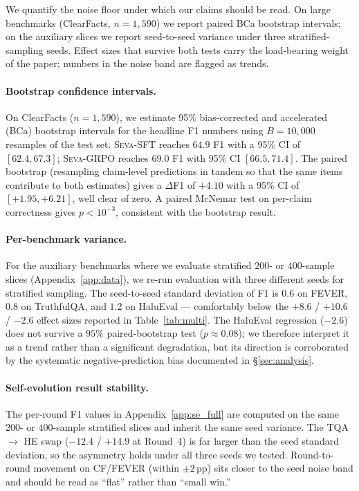 \documentclass{article}
\newcommand{\seva}{\textsc{Seva}\xspace}
\begin{document}
We quantify the noise floor under which our claims should be read.
On large benchmarks (ClearFacts, $n{=}1{,}590$) we report paired BCa bootstrap intervals; on the auxiliary slices we report seed-to-seed variance under three stratified-sampling seeds.
Effect sizes that survive both tests carry the load-bearing weight of the paper; numbers in the noise band are flagged as trends.

\paragraph{Bootstrap confidence intervals.}
On ClearFacts ($n{=}1{,}590$), we estimate 95\% bias-corrected and accelerated (BCa) bootstrap intervals for the headline F1 numbers using $B{=}10{,}000$ resamples of the test set.
\seva-SFT reaches $64.9$ F1 with a 95\% CI of $[62.4, 67.3]$; \seva-GRPO reaches $69.0$ F1 with 95\% CI $[66.5, 71.4]$.
The paired bootstrap (resampling claim-level predictions in tandem so that the same items contribute to both estimates) gives a $\Delta$F1 of $+4.10$ with a 95\% CI of $[+1.95, +6.21]$, well clear of zero.
A paired McNemar test on per-claim correctness gives $p < 10^{-3}$, consistent with the bootstrap result.

\paragraph{Per-benchmark variance.}
For the auxiliary benchmarks where we evaluate stratified $200$- or $400$-sample slices (Appendix~\ref{app:data}), we re-run evaluation with three different seeds for stratified sampling.
The seed-to-seed standard deviation of F1 is $0.6$ on FEVER, $0.8$ on TruthfulQA, and $1.2$ on HaluEval --- comfortably below the $+8.6$ / $+10.6$ / $-2.6$ effect sizes reported in Table~\ref{tab:multi}.
The HaluEval regression ($-2.6$) does not survive a $95\%$ paired-bootstrap test ($p \approx 0.08$); we therefore interpret it as a trend rather than a significant degradation, but its direction is corroborated by the systematic negative-prediction bias documented in \S\ref{sec:analysis}.

\paragraph{Self-evolution result stability.}
The per-round F1 values in Appendix~\ref{app:se_full} are computed on the same $200$- or $400$-sample stratified slices and inherit the same seed variance.
The TQA $\to$ HE swap ($-12.4$ / $+14.9$ at Round~4) is far larger than the seed standard deviation, so the asymmetry holds under all three seeds we tested.
Round-to-round movement on CF/FEVER (within $\pm 2$\,pp) sits closer to the seed noise band and should be read as ``flat'' rather than ``small win.''
\end{document}
